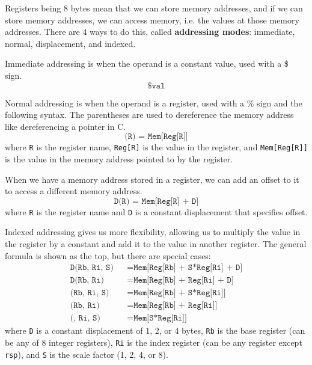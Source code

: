   Registers being 8 bytes mean that we can store memory addresses, and if we can store memory addresses, we can access memory, i.e. the values at those memory addresses. There are 4 ways to do this, called \textbf{addressing modes}: immediate, normal, displacement, and indexed. 

  \begin{definition}
    Immediate addressing is when the operand is a constant value, used with a \$ sign. 
    \begin{equation}
      \texttt{\$val}
    \end{equation}
  \end{definition}

  \begin{definition}
    Normal addressing is when the operand is a register, used with a \% sign and the following syntax. The parentheses are used to dereference the memory address like dereferencing a pointer in C. 
    \begin{equation}
      \texttt{(R) = Mem[Reg[R]]}
    \end{equation}
    where \texttt{R} is the register name, \texttt{Reg[R]} is the value in the register, and \texttt{Mem[Reg[R]]} is the value in the memory address pointed to by the register. 
  \end{definition}

  \begin{definition}
    When we have a memory address stored in a register, we can add an offset to it to access a different memory address. 
    \begin{equation}
      \texttt{D(R) = Mem[Reg[R] + D]}
    \end{equation}
    where \texttt{R} is the register name and \texttt{D} is a constant displacement that specifies offset. 
  \end{definition}

  \begin{definition}
    Indexed addressing gives us more flexibility, allowing us to multiply the value in the register by a constant and add it to the value in another register. The general formula is shown as the top, but there are special cases: 
    \begin{align*}
      \texttt{D(Rb, Ri, S)} && = \texttt{Mem[Reg[Rb] + S*Reg[Ri] + D]} \\ 
      \texttt{D(Rb, Ri)} && = \texttt{Mem[Reg[Rb] + Reg[Ri] + D]} \\
      \texttt{(Rb, Ri, S)} && = \texttt{Mem[Reg[Rb] + S*Reg[Ri]]} \\ 
      \texttt{(Rb, Ri)} && = \texttt{Mem[Reg[Rb] + Reg[Ri]]} \\
      \texttt{(, Ri, S)} && = \texttt{Mem[S*Reg[Ri]]} 
    \end{align*}
    where \texttt{D} is a constant displacement of 1, 2, or 4 bytes, \texttt{Rb} is the base register (can be any of 8 integer registers), \texttt{Ri} is the index register (can be any register except \texttt{rsp}), and \texttt{S} is the scale factor (1, 2, 4, or 8). 
  \end{definition}

